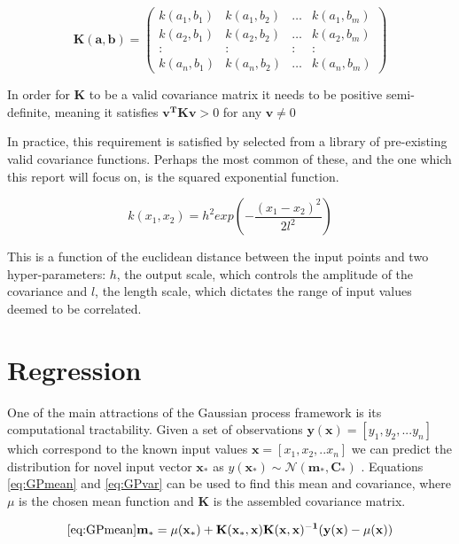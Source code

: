 \documentclass[a4paper,11pt]{report}
\begin{document}
\begin{equation}
\mathbf{K(a,b)} =  \left( \begin{array}{cccc}
k(a_1,b_1) & k(a_1,b_2) &  \dots & k(a_1,b_m) \\
k(a_2,b_1) & k(a_2,b_2) &  \dots & k(a_2,b_m) \\
: & : & : & : \\
k(a_n,b_1) & k(a_n,b_2) &  \dots & k(a_n,b_m)  \end{array} \right) 
\end{equation}

In order for \(\mathbf{K}\) to be a valid covariance matrix it needs to be positive semi-definite, meaning it satisfies \( \mathbf{v^{T} K v} > 0\) for any \( \mathbf{v} \neq 0 \)

In practice, this requirement is satisfied by selected from a library of pre-existing valid covariance functions. Perhaps the most common of these, and the one which this report will focus on, is the squared exponential function.

\begin{equation}
k(x_1,x_2) = h^2 exp(- \frac{(x_1-x_2)^2}{2 l^2})
\end{equation} 

This is a function of the euclidean distance between the input points and two hyper-parameters: \(h\), the output scale, which controls the amplitude of the covariance and \(l\), the length scale, which dictates the range of input values deemed to be correlated. 

\section{Regression}

One of the main attractions of the Gaussian process framework is its computational tractability. Given a set of observations \( \mathbf{y}( \mathbf{x} ) = [y_1, y_2, ... y_n] \) which correspond to the known input values \( \mathbf{x} = [x_1, x_2, .. x_n] \) we can predict the distribution for novel input vector \( \mathbf{x_*} \) as \( y( \mathbf{x_*}) \sim \mathcal{N}(\mathbf{m_*,C_*}) \) \cite{GP-robots}. Equations \ref{eq:GPmean} and \ref{eq:GPvar} can be used to find this mean and covariance, where \(\mu\) is the chosen mean function and \(\mathbf{K}\) is the assembled covariance matrix.

\singlespacing

\begin{equation} \ref{eq:GPmean}
\mathbf{m_* = \mu (x_*) + K(x_* ,x) K(x,x)^{-1} (y(x) - \mu (x))}
\end{equation}
\end{document}
